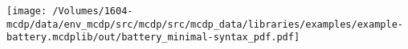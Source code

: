 
    \texttt{[image: /Volumes/1604-mcdp/data/env\_mcdp/src/mcdp/src/mcdp\_data/libraries/examples/example-battery.mcdplib/out/battery\_minimal-syntax\_pdf.pdf]}
    
